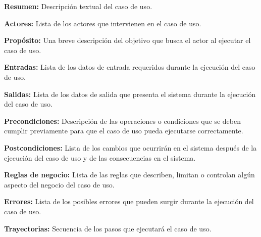      \begin{objetivos}
	\item {\bf Resumen:} Descripción textual del caso de uso.
	\item {\bf Actores:} Lista de los actores que intervienen en el caso de uso.
	\item {\bf Propósito:} Una breve descripción del objetivo que busca el actor al ejecutar el caso de uso.
	\item {\bf Entradas:} Lista de los datos de entrada requeridos durante la ejecución del caso de uso.
	\item {\bf Salidas:} Lista de los datos de salida que presenta el sistema durante la ejecución del caso de uso.
	\item {\bf Precondiciones:} Descripción de las operaciones o condiciones que se deben cumplir previamente para que el caso de uso pueda ejecutarse correctamente.
	\item {\bf Postcondiciones:} Lista de los cambios que ocurrirán en el sistema después de la ejecución del caso de uso y de las consecuencias en el sistema.
	\item {\bf Reglas de negocio:} Lista de las reglas que describen, limitan o controlan algún aspecto del negocio del caso de uso.
	\item {\bf Errores:} Lista de los posibles errores que pueden surgir durante la ejecución del caso de uso.
	\item {\bf Trayectorias:} Secuencia de los pasos que ejecutará el caso de uso.
    \end{objetivos}

 

